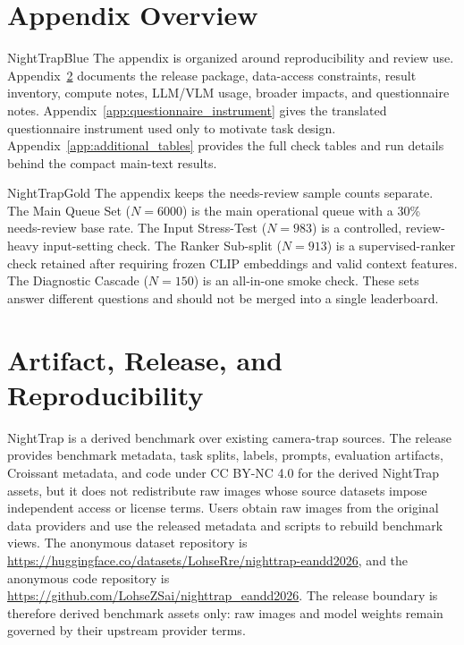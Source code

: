 \documentclass{article}
\begin{document}
\clearpage
\appendix

\section{Appendix Overview}

\begin{appendixbox}[title={What the appendix contains}]{NightTrapBlue}
The appendix is organized around reproducibility and review use. Appendix~\ref{app:release_reproducibility} documents the release package, data-access constraints, result inventory, compute notes, LLM/VLM usage, broader impacts, and questionnaire notes. Appendix~\ref{app:questionnaire_instrument} gives the translated questionnaire instrument used only to motivate task design. Appendix~\ref{app:additional_tables} provides the full check tables and run details behind the compact main-text results.
\end{appendixbox}

\begin{appendixbox}[title={How to read the needs-review tables}]{NightTrapGold}
The appendix keeps the needs-review sample counts separate. The Main Queue Set ($N=6000$) is the main operational queue with a 30\% needs-review base rate. The Input Stress-Test ($N=983$) is a controlled, review-heavy input-setting check. The Ranker Sub-split ($N=913$) is a supervised-ranker check retained after requiring frozen CLIP embeddings and valid context features. The Diagnostic Cascade ($N=150$) is an all-in-one smoke check. These sets answer different questions and should not be merged into a single leaderboard.
\end{appendixbox}

\section{Artifact, Release, and Reproducibility}
\label{app:release_reproducibility}

NightTrap is a derived benchmark over existing camera-trap sources. The release provides benchmark metadata, task splits, labels, prompts, evaluation artifacts, Croissant metadata, and code under CC BY-NC 4.0 for the derived NightTrap assets, but it does not redistribute raw images whose source datasets impose independent access or license terms. Users obtain raw images from the original data providers and use the released metadata and scripts to rebuild benchmark views. The anonymous dataset repository is \url{https://huggingface.co/datasets/LohseRre/nighttrap-eandd2026}, and the anonymous code repository is \url{https://github.com/LohseZSai/nighttrap_eandd2026}. The release boundary is therefore derived benchmark assets only: raw images and model weights remain governed by their upstream provider terms.
\end{document}
